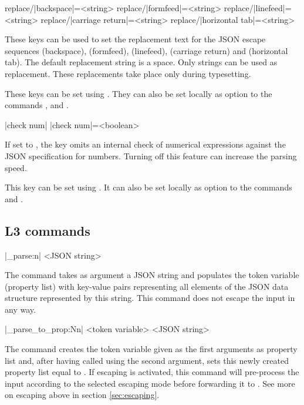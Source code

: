 \documentclass[a4paper]{article}
\begin{document}
{{\begin{macrodef}
replace/|backspace|={<string>}
replace/|formfeed|={<string>}
replace/|linefeed|={<string>}
replace/|carriage return|={<string>}
replace/|horizontal tab|={<string>}
\end{macrodef}
These keys can be used to set the replacement text for the JSON escape sequences \macro{\b} (backspace), \macro{\f} (formfeed), \macro{\n} (linefeed), \macro{\r} (carriage return) and \macro{\t} (horizontal tab). The default replacement string is a space. Only strings can be used as replacement. These replacements take place only during typesetting.

These keys can be set using \macro{\JSONParseSet}. They can also be set locally as option to the commands \macro{\JSONParseValue}, \macro{\JSONParseArrayValues} and \macro{\JSONParseArrayValuesMap}.
\begin{macrodef}
|check num|
|check num|={<boolean>}
\end{macrodef}
If set to , the key  omits an internal check of numerical expressions against the JSON specification for numbers. Turning off this feature can increase the parsing speed.

This key can be set using \macro{\JSONParseSet}. It can also be set locally as option to the commands \macro{\JSONParse} and \macro{\JSONParseFromFile}.
    
\subsection{L3 commands}

\begin{macrodef}
|\jsonparse_parse:n| {<JSON string>}
\end{macrodef}
The command  takes as argument a JSON string and populates the token variable (property list)  with key-value pairs representing all elements of the JSON data structure represented by this string. This command does not escape the input in any way.
  
\begin{macrodef}
|\jsonparse_parse_to_prop:Nn| <token variable> {<JSON string>}
\end{macrodef}
The command  creates the token variable given as the first arguments as property list and, after having called  using the second argument, sets this newly created property list equal to . If escaping is activated, this command will pre-process the input according to the selected escaping mode before forwarding it to . See more on escaping above in section \ref{sec:escaping}. 

}}
\end{document}
